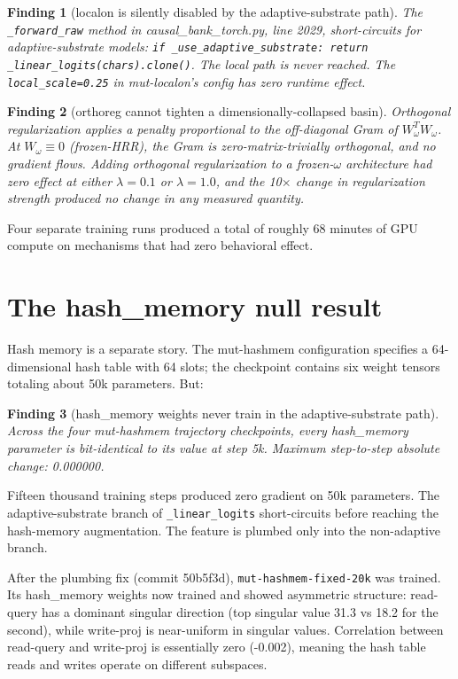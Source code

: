 \documentclass[11pt,openany]{book}
\newtheorem{finding}{Finding}[chapter]
\begin{document}
\begin{finding}[localon is silently disabled by the adaptive-substrate
path]
The \texttt{\_forward\_raw} method in causal\_bank\_torch.py, line
2029, short-circuits for adaptive-substrate models:
\texttt{if \_use\_adaptive\_substrate: return \_linear\_logits(chars).clone()}.
The local path is never reached. The \texttt{local\_scale=0.25} in
mut-localon's config has zero runtime effect.
\end{finding}

\begin{finding}[orthoreg cannot tighten a dimensionally-collapsed
basin]
Orthogonal regularization applies a penalty proportional to the
off-diagonal Gram of $W_\omega^T W_\omega$. At $W_\omega \equiv 0$
(frozen-HRR), the Gram is zero-matrix-trivially orthogonal, and no
gradient flows. Adding orthogonal regularization to a frozen-$\omega$
architecture had zero effect at either $\lambda=0.1$ or $\lambda=1.0$,
and the 10$\times$ change in regularization strength produced no
change in any measured quantity.
\end{finding}

Four separate training runs produced a total of roughly 68 minutes
of GPU compute on mechanisms that had zero behavioral effect.

\section{The hash\_memory null result}

Hash memory is a separate story. The mut-hashmem configuration
specifies a 64-dimensional hash table with 64 slots; the checkpoint
contains six weight tensors totaling about 50k parameters. But:

\begin{finding}[hash\_memory weights never train in the adaptive-substrate
path]
Across the four mut-hashmem trajectory checkpoints, every hash\_memory
parameter is bit-identical to its value at step 5k. Maximum
step-to-step absolute change: 0.000000.
\end{finding}

Fifteen thousand training steps produced zero gradient on 50k
parameters. The adaptive-substrate branch of \texttt{\_linear\_logits}
short-circuits before reaching the hash-memory augmentation. The
feature is plumbed only into the non-adaptive branch.

After the plumbing fix (commit 50b5f3d),
\texttt{mut-hashmem-fixed-20k} was trained. Its hash\_memory weights
now trained and showed asymmetric structure: read-query has a
dominant singular direction (top singular value 31.3 vs 18.2 for the
second), while write-proj is near-uniform in singular values.
Correlation between read-query and write-proj is essentially zero
(-0.002), meaning the hash table reads and writes operate on different
subspaces.
\end{document}

